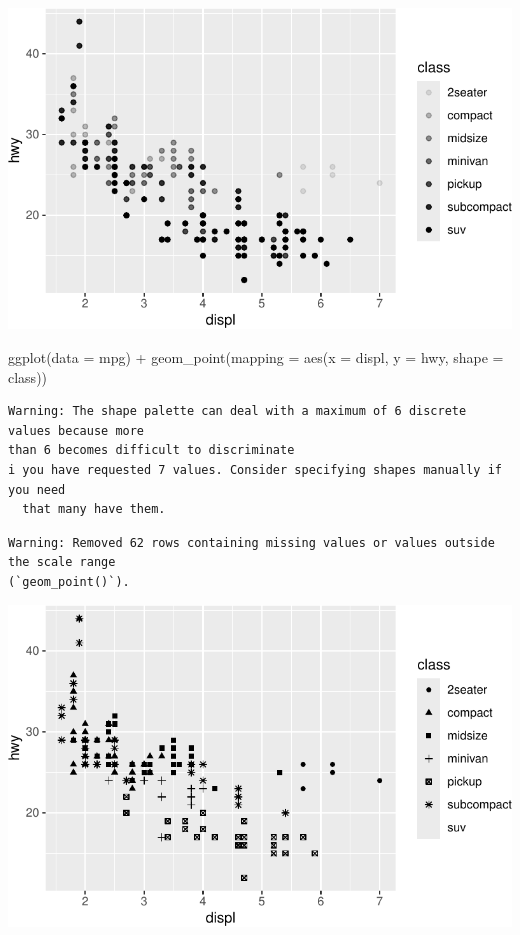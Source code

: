 \documentclass[
  letterpaper,
  DIV=11,
  numbers=noendperiod]{scrreprt}
\newenvironment{Shaded}{\begin{snugshade}}{\end{snugshade}}
\newcommand{\AttributeTok}[1]{\textcolor[rgb]{0.40,0.45,0.13}{#1}}
\newcommand{\FunctionTok}[1]{\textcolor[rgb]{0.28,0.35,0.67}{#1}}
\newcommand{\NormalTok}[1]{\textcolor[rgb]{0.00,0.23,0.31}{#1}}
\newcommand{\SpecialCharTok}[1]{\textcolor[rgb]{0.37,0.37,0.37}{#1}}
\begin{document}
\includegraphics{Beginning_Data_Visualization_files/figure-pdf/Example 3-1.pdf}

\begin{Shaded}
\begin{Highlighting}[]
\FunctionTok{ggplot}\NormalTok{(}\AttributeTok{data =}\NormalTok{ mpg) }\SpecialCharTok{+} 
  \FunctionTok{geom\_point}\NormalTok{(}\AttributeTok{mapping =} \FunctionTok{aes}\NormalTok{(}\AttributeTok{x =}\NormalTok{ displ, }\AttributeTok{y =}\NormalTok{ hwy, }\AttributeTok{shape =}\NormalTok{ class))}
\end{Highlighting}
\end{Shaded}

\begin{verbatim}
Warning: The shape palette can deal with a maximum of 6 discrete values because more
than 6 becomes difficult to discriminate
i you have requested 7 values. Consider specifying shapes manually if you need
  that many have them.
\end{verbatim}

\begin{verbatim}
Warning: Removed 62 rows containing missing values or values outside the scale range
(`geom_point()`).
\end{verbatim}

\includegraphics{Beginning_Data_Visualization_files/figure-pdf/Example 3-2.pdf}
\end{document}
